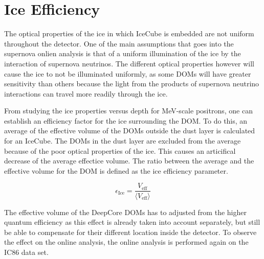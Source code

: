 \section{Ice Efficiency}

The optical properties of the ice in which IceCube is embedded are not uniform throughout the detector. One of the main assumptions that goes into the supernova onlien analysis is that of a uniform illumination of the ice by the interaction of supernova neutrinos. The different optical properties however will cause the ice to not be illuminated uniformly, as some DOMs will have greater sensitivity than others because the light from the products of supernova neutrino interactions can travel more readily through the ice.

From studying the ice properties versus depth for MeV-scale positrons, one can establish an efficiency factor for the ice surrounding the DOM. To do this, an average of the effective volume of the DOMs outside the dust layer is calculated for an IceCube. The DOMs in the dust layer are excluded from the average because of the poor optical properties of the ice. This causes an articifical decrease of the average effectice volume. The ratio between the average and the effective volume for the DOM is defined as the ice efficiency parameter.

\begin{equation}
  \epsilon_{\textrm{Ice}} = \frac{ V_{\textrm{eff}} }{ \langle V_{\textrm{eff}} \rangle }	
\end{equation}

 The effective volume of the DeepCore DOMs has to adjusted from the higher quantum efficiency as this effect is already taken into account separately, but still be able to compensate for their different location inside the detector. To observe the effect on the online analysis, the online analysis is performed again on the IC86 data set.